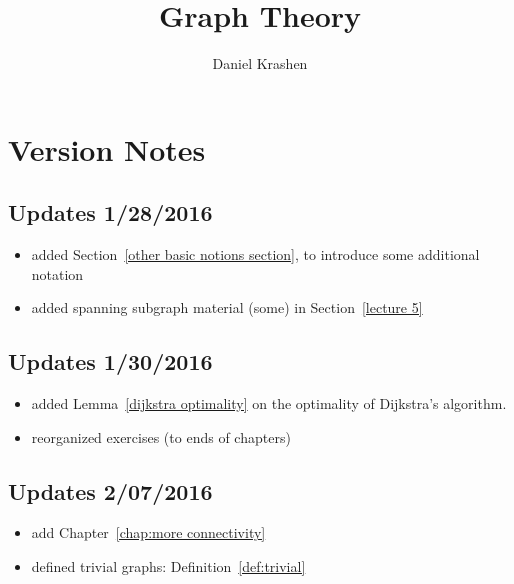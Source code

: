 \documentclass[12pt]{report}
\theoremstyle{plain}
\begin{document}


\author{Daniel Krashen}
\title{Graph Theory}

\maketitle
\tableofcontents


\chapter*{Version Notes}

\section{Updates 1/28/2016}
\begin{itemize}
\item added Section~\ref{other basic notions section}, to introduce some
additional notation
\item added spanning subgraph material (some) in Section~\ref{lecture 5}
\end{itemize}

\section{Updates 1/30/2016}
\begin{itemize}
\item added Lemma~\ref{dijkstra optimality}
on the optimality of Dijkstra's algorithm.
\item reorganized exercises (to ends of chapters)
\end{itemize}

\section{Updates 2/07/2016}
\begin{itemize}
\item add Chapter~\ref{chap:more connectivity}
\item defined trivial graphs: Definition~\ref{def:trivial}
\end{itemize}
\end{document}
